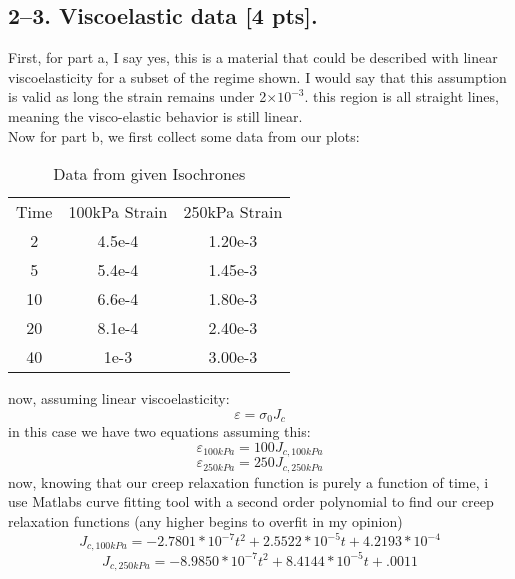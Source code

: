 \subsection*{2--3. \textbf{Viscoelastic data} [4 pts].} 
First, for part a, I say yes, this is a material that could be described with linear viscoelasticity for a subset of the regime shown. I would say that this assumption is valid as long the strain remains under 2$\times 10^{-3}$. this region is all straight lines, meaning the visco-elastic behavior is still linear.\\
\medskip
Now for part b, we first collect some data from our plots:
\begin{table}[H]
    \centering
    \begin{tabular}{c|c|c}
        Time & 100kPa Strain& 250kPa Strain \\
        2 & 4.5e-4 & 1.20e-3\\
        5 & 5.4e-4 & 1.45e-3\\
        10 & 6.6e-4 & 1.80e-3\\
        20 & 8.1e-4& 2.40e-3\\
        40 & 1e-3 & 3.00e-3\\
    \end{tabular}
    \caption{Data from given Isochrones}
    \label{tab:placeholder}
\end{table}
now, assuming linear viscoelasticity:
\begin{equation}
    \varepsilon = \sigma_0J_{c}
\end{equation}
in this case we have two equations assuming this:
\begin{equation}
     \varepsilon_{100kPa} = 100J_{c,100kPa}
\end{equation}
\begin{equation}
     \varepsilon_{250kPa} = 250 J_{c,250kPa}
\end{equation}
now, knowing that our creep relaxation function is purely a function of time, i use Matlabs curve fitting tool with a second order polynomial to find our creep relaxation functions (any higher begins to overfit in my opinion)
\begin{equation}
    \boxed{J_{c,100kPa} = -2.7801*10^{-7}t^2+ 2.5522*10^{-5}t+4.2193*10^{-4}}
\end{equation}
\begin{equation}
    \boxed{J_{c,250kPa} = -8.9850*10^{-7}t^2+ 8.4144*10^{-5}t+.0011}
\end{equation}


\bigskip
